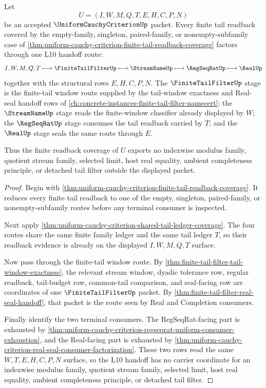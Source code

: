 \begin{theorem}
\label{thm:uniform-cauchy-criterion-finite-tail-window-factorization}
Let
$$
U=(I,W,M,Q,T,E,H,C,P,N)
$$
be an accepted $\UniformCauchyCriterionUp$ packet. Every finite tail readback covered by the empty-family, singleton, paired-family, or nonempty-subfamily case of \autoref{thm:uniform-cauchy-criterion-finite-tail-readback-coverage} factors through one L10 handoff route:
$$
I,W,M,Q,T \longmapsto \FiniteTailFilterUp \longmapsto \StreamNameUp \longmapsto \RegSeqRatUp \longmapsto \RealUp
$$
together with the structural rows $E,H,C,P,N$. The $\FiniteTailFilterUp$ stage is the finite-tail window route supplied by the tail-window exactness and Real-seal handoff rows of \autoref{ch:concrete-instances-finite-tail-filter-namecert}; the $\StreamNameUp$ stage reads the finite-window classifier already displayed by $W$; the $\RegSeqRatUp$ stage consumes the tail readback carried by $T$; and the $\RealUp$ stage seals the same route through $E$.

Thus the finite readback coverage of $U$ exports no indexwise modulus family, quotient stream family, selected limit, host real equality, ambient completeness principle, or detached tail filter outside the displayed packet.
\end{theorem}
\begin{proof}
Begin with \autoref{thm:uniform-cauchy-criterion-finite-tail-readback-coverage}. It reduces every finite tail readback to one of the empty, singleton, paired-family, or nonempty-subfamily routes before any terminal consumer is inspected.

Next apply \autoref{thm:uniform-cauchy-criterion-shared-tail-ledger-coverage}. The four routes share the same finite family ledger and the same tail ledger $T$, so their readback evidence is already on the displayed $I,W,M,Q,T$ surface.

Now pass through the finite-tail window route. By \autoref{thm:finite-tail-filter-tail-window-exactness}, the relevant stream window, dyadic tolerance row, regular readback, tail-budget row, common-tail comparison, and seal-facing row are coordinates of one $\FiniteTailFilterUp$ packet. By \autoref{thm:finite-tail-filter-real-seal-handoff}, that packet is the route seen by Real and Completion consumers.

Finally identify the two terminal consumers. The RegSeqRat-facing part is exhausted by \autoref{thm:uniform-cauchy-criterion-regseqrat-uniform-consumer-exhaustion}, and the Real-facing part is exhausted by \autoref{thm:uniform-cauchy-criterion-real-seal-consumer-factorization}. These two rows read the same $W,T,E,H,C,P,N$ surface, so the L10 handoff has no carrier coordinate for an indexwise modulus family, quotient stream family, selected limit, host real equality, ambient completeness principle, or detached tail filter.
\end{proof}

